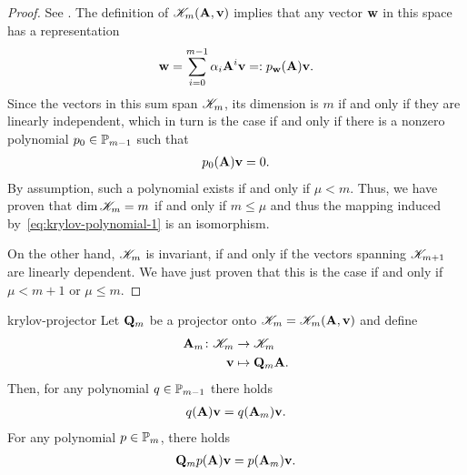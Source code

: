 \begin{proof}
  See \cite[Propositions 6.1 \& 6.2]{Saad00}.
  The definition of $\krylov_m(\mata,\vv)$ implies that any vector $\vw$ in this space has a representation
  \begin{gather}
    \vw = \sum_{i=0}^{m-1} \alpha_i \mata^i\vv =: p_{\vw}(\mata) \vv.
  \end{gather}
  Since the vectors in this sum span $\krylov_m$, its dimension is
  $m$ if and only if they are linearly independent, which in turn is
  the case if and only if there is a nonzero polynomial
  $p_0\in\P_{m-1}$ such that
  \begin{gather}
    p_0(\mata)\vv = 0.
  \end{gather}
  By assumption, such a polynomial exists if and only if
  $\mu<m$. Thus, we have proven that $\dim \krylov_m = m$ if and only
  if $m\le \mu$ and thus the mapping induced
  by~\eqref{eq:krylov-polynomial-1} is an isomorphism.

  On the other hand, $\krylov_m$ is invariant, if and only if the
  vectors spanning $\krylov_{m+1}$ are linearly dependent. We have
  just proven that this is the case if and only if $\mu<m+1$ or
  $\mu\le m$.
\end{proof}

\begin{Lemma}{krylov-projector}
  Let $\matq_m$ be a projector onto $\krylov_m=\krylov_m(\mata,\vv)$ and define
  \begin{align}
    \mata_m\colon \krylov_m &\to \krylov_m\\
    \vv&\mapsto \matq_m \mata.
  \end{align}
  Then, for any polynomial $q\in\P_{m-1}$ there holds
  \begin{gather}
    \label{eq:krylov-projector-1}
    q(\mata)\vv = q(\mata_m)\vv.
  \end{gather}
  For any polynomial $p\in\P_m$, there holds
  \begin{gather}
    \label{eq:krylov-projector-2}
    \matq_m p(\mata)\vv = p(\mata_m)\vv.
  \end{gather}
\end{Lemma}

